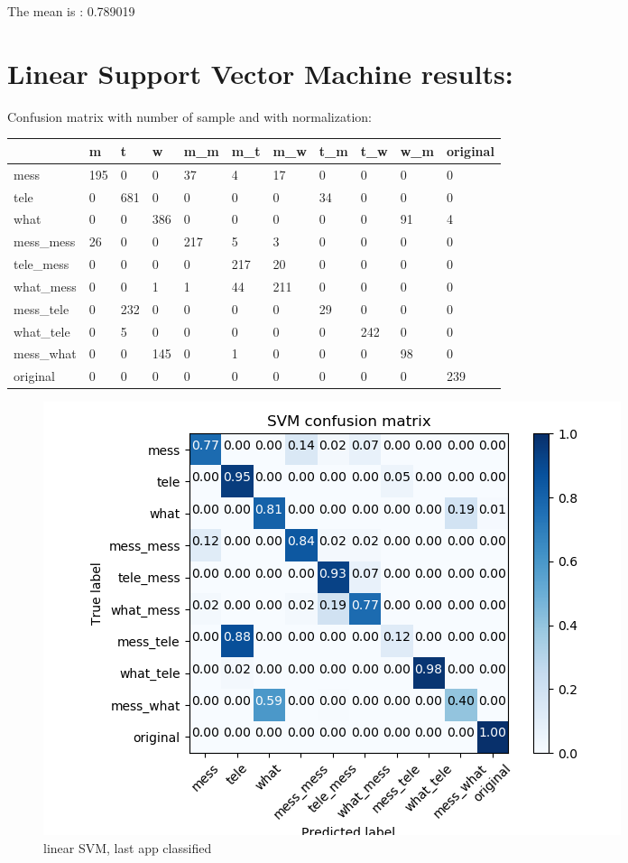 The mean is : 0.789019\section{Linear Support Vector Machine results:} 
Confusion matrix with number of sample and with normalization:
 {\def\arraystretch{1.3} 
 \begin{table}[H] 
\centering 
\begin{tabular}{|l|l|l|l|l|l|l|l|l|l|l|} 
\hline 
  &m  &t  &w  &m\_m  &m\_t  &m\_w  &t\_m  &t\_w  &w\_m  &original  \\ \hline
mess  &195  &0  &0  &37  &4  &17  &0  &0  &0  &0  \\ \hline
tele  &0  &681  &0  &0  &0  &0  &34  &0  &0  &0  \\ \hline
what  &0  &0  &386  &0  &0  &0  &0  &0  &91  &4  \\ \hline
mess\_mess  &26  &0  &0  &217  &5  &3  &0  &0  &0  &0  \\ \hline
tele\_mess  &0  &0  &0  &0  &217  &20  &0  &0  &0  &0  \\ \hline
what\_mess  &0  &0  &1  &1  &44  &211  &0  &0  &0  &0  \\ \hline
mess\_tele  &0  &232  &0  &0  &0  &0  &29  &0  &0  &0  \\ \hline
what\_tele  &0  &5  &0  &0  &0  &0  &0  &242  &0  &0  \\ \hline
mess\_what  &0  &0  &145  &0  &1  &0  &0  &0  &98  &0  \\ \hline
original  &0  &0  &0  &0  &0  &0  &0  &0  &0  &239  \\ \hline
\end{tabular} 
\end{table} }

 \begin{figure}[H] 
\centering 
\includegraphics[scale=.6]{images/lsvm_initial_single_double_complete.png} 
\caption{linear SVM, last app classified} 
\end{figure} 


